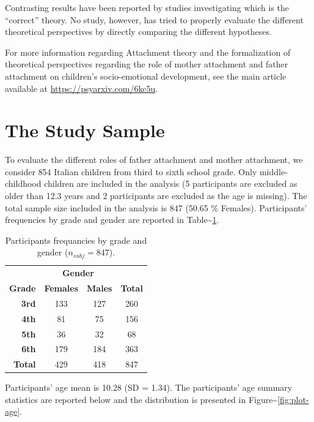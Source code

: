 \documentclass[
]{book}
\begin{document}
Contrasting results have been reported by studies investigating which is the ``correct'' theory. No study, however, has tried to properly evaluate the different theoretical perspectives by directly comparing the different hypotheses.

For more information regarding Attachment theory and the formalization of theoretical perspectives regarding the role of mother attachment and father attachment on children's socio-emotional development, see the main article available at \url{https://psyarxiv.com/6kc5u}.

\hypertarget{the-study-sample}{%
\section{The Study Sample}\label{the-study-sample}}

To evaluate the different roles of father attachment and mother attachment, we consider 854 Italian children from third to sixth school grade. Only middle-childhood children are included in the analysis (5 participants are excluded as older than 12.3 years and 2 participants are excluded as the age is missing). The total sample size included in the analysis is 847 (50.65 \% Females). Participants' frequencies by grade and gender are reported in Table\textasciitilde\ref{tab:table-gender-grade}.

\begin{table}[!h]

\caption{\label{tab:table-gender-grade}Participants frequancies by grade and gender ($n_{subj} = 847$).}
\centering
\begin{tabular}[t]{>{}rccc}
\toprule
\multicolumn{1}{c}{\textbf{ }} & \multicolumn{2}{c}{\textbf{Gender}} & \multicolumn{1}{c}{\textbf{ }} \\
\cmidrule(l{3pt}r{3pt}){2-3}
\textbf{Grade} & \textbf{Females} & \textbf{Males} & \textbf{Total}\\
\midrule
\textbf{3rd} & 133 & 127 & 260\\
\textbf{4th} & 81 & 75 & 156\\
\textbf{5th} & 36 & 32 & 68\\
\textbf{6th} & 179 & 184 & 363\\
\textbf{Total} & 429 & 418 & 847\\
\bottomrule
\end{tabular}
\end{table}

Participants' age mean is 10.28 (SD = 1.34). The participants' age summary statistics are reported below and the distribution is presented in Figure\textasciitilde\ref{fig:plot-age}.
\end{document}
